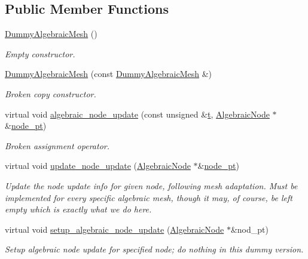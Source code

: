 \subsection*{Public Member Functions}
\begin{DoxyCompactItemize}
\item 
\hyperlink{classoomph_1_1DummyAlgebraicMesh_a507172ac8c9bb703c39c67ec0be542f8}{Dummy\+Algebraic\+Mesh} ()
\begin{DoxyCompactList}\small\item\em Empty constructor. \end{DoxyCompactList}\item 
\hyperlink{classoomph_1_1DummyAlgebraicMesh_a2c0b415c09628533adb8847635e44f39}{Dummy\+Algebraic\+Mesh} (const \hyperlink{classoomph_1_1DummyAlgebraicMesh}{Dummy\+Algebraic\+Mesh} \&)
\begin{DoxyCompactList}\small\item\em Broken copy constructor. \end{DoxyCompactList}\item 
virtual void \hyperlink{classoomph_1_1DummyAlgebraicMesh_ae13a52cb8561a07233851e2d1db7b4e4}{algebraic\+\_\+node\+\_\+update} (const unsigned \&\hyperlink{cfortran_8h_af6f0bd3dc13317f895c91323c25c2b8f}{t}, \hyperlink{classoomph_1_1AlgebraicNode}{Algebraic\+Node} $\ast$\&\hyperlink{classoomph_1_1AlgebraicMesh_aedeebbe95d2f8e67e9939cecd1be3933}{node\+\_\+pt})
\begin{DoxyCompactList}\small\item\em Broken assignment operator. \end{DoxyCompactList}\item 
virtual void \hyperlink{classoomph_1_1DummyAlgebraicMesh_a8797e6bf088b172b5d7e1de8a2dfc326}{update\+\_\+node\+\_\+update} (\hyperlink{classoomph_1_1AlgebraicNode}{Algebraic\+Node} $\ast$\&\hyperlink{classoomph_1_1AlgebraicMesh_aedeebbe95d2f8e67e9939cecd1be3933}{node\+\_\+pt})
\begin{DoxyCompactList}\small\item\em Update the node update info for given node, following mesh adaptation. Must be implemented for every specific algebraic mesh, though it may, of course, be left empty which is exactly what we do here. \end{DoxyCompactList}\item 
virtual void \hyperlink{classoomph_1_1DummyAlgebraicMesh_a6c325393401f636979ea1a0079503f03}{setup\+\_\+algebraic\+\_\+node\+\_\+update} (\hyperlink{classoomph_1_1AlgebraicNode}{Algebraic\+Node} $\ast$\&nod\+\_\+pt)
\begin{DoxyCompactList}\small\item\em Setup algebraic node update for specified node; do nothing in this dummy version. \end{DoxyCompactList}\end{DoxyCompactItemize}
